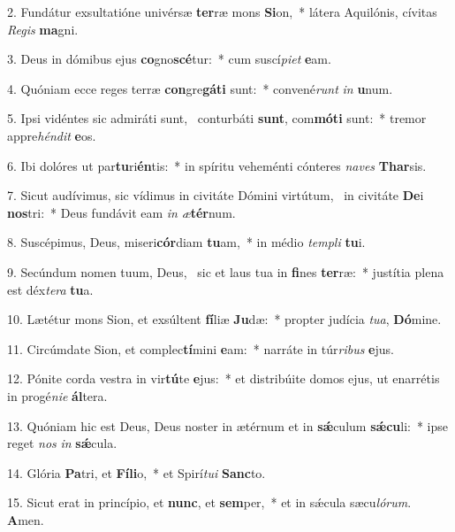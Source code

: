 2. Fundátur exsultatióne univérsæ \textbf{ter}ræ mons \textbf{Si}on,~*  látera Aquilónis, cívitas \textit{Re}\textit{gis} \textbf{ma}gni.\

3. Deus in dómibus ejus \textbf{co}gno\textbf{scé}tur:~*  cum suscí\textit{pi}\textit{et} \textbf{e}am.\

4. Quóniam ecce reges terræ \textbf{con}gre\textbf{gá}\textbf{ti} sunt:~*  convené\textit{runt} \textit{in} \textbf{u}num.\

5. Ipsi vidéntes sic admiráti sunt, \dag\  conturbáti \textbf{sunt}, com\textbf{mó}\textbf{ti} sunt:~*  tremor appre\textit{hén}\textit{dit} \textbf{e}os.\

6. Ibi dolóres ut par\textbf{tu}ri\textbf{én}tis:~*  in spíritu veheménti cónteres \textit{na}\textit{ves} \textbf{Thar}sis.\

7. Sicut audívimus, sic vídimus in civitáte Dómini virtútum, \dag\  in civitáte \textbf{De}i \textbf{nos}tri:~*  Deus fundávit eam \textit{in} \textit{æ}\textbf{tér}num.\

8. Suscépimus, Deus, miseri\textbf{cór}diam \textbf{tu}am,~*  in médio \textit{tem}\textit{pli} \textbf{tu}i.\

9. Secúndum nomen tuum, Deus, \dag\  sic et laus tua in \textbf{fi}nes \textbf{ter}ræ:~*  justítia plena est déx\textit{te}\textit{ra} \textbf{tu}a.\

10. Lætétur mons Sion, et exsúltent \textbf{fí}liæ \textbf{Ju}dæ:~*  propter judícia \textit{tu}\textit{a}, \textbf{Dó}mine.\

11. Circúmdate Sion, et complec\textbf{tí}mini \textbf{e}am:~*  narráte in túr\textit{ri}\textit{bus} \textbf{e}jus.\

12. Pónite corda vestra in vir\textbf{tú}te \textbf{e}jus:~*  et distribúite domos ejus, ut enarrétis in progé\textit{ni}\textit{e} \textbf{ál}tera.\

13. Quóniam hic est Deus, Deus noster in ætérnum et in \textbf{sǽ}culum \textbf{sǽ}\textbf{cu}li:~*  ipse reget \textit{nos} \textit{in} \textbf{sǽ}cula.\

14. Glória \textbf{Pa}tri, et \textbf{Fí}\textbf{li}o,~*  et Spirí\textit{tu}\textit{i} \textbf{Sanc}to.\

15. Sicut erat in princípio, et \textbf{nunc}, et \textbf{sem}per,~*  et in sǽcula sæcu\textit{ló}\textit{rum}. \textbf{A}men.\

